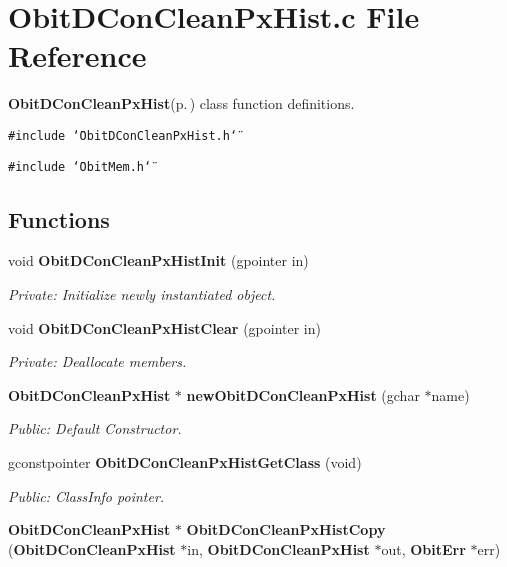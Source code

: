 \section{Obit\-DCon\-Clean\-Px\-Hist.c File Reference}
\label{ObitDConCleanPxHist_8c}
{\bf Obit\-DCon\-Clean\-Px\-Hist}{\rm (p.\,\pageref{structObitDConCleanPxHist})} class function definitions. 

{\tt \#include \char`\"{}Obit\-DCon\-Clean\-Px\-Hist.h\char`\"{}}\par
{\tt \#include \char`\"{}Obit\-Mem.h\char`\"{}}\par
\subsection*{Functions}
\begin{CompactItemize}
\item 
void {\bf Obit\-DCon\-Clean\-Px\-Hist\-Init} (gpointer in)
\begin{CompactList}\small\item\em Private: Initialize newly instantiated object. \item\end{CompactList}\item 
void {\bf Obit\-DCon\-Clean\-Px\-Hist\-Clear} (gpointer in)
\begin{CompactList}\small\item\em Private: Deallocate members. \item\end{CompactList}\item 
{\bf Obit\-DCon\-Clean\-Px\-Hist} $\ast$ {\bf new\-Obit\-DCon\-Clean\-Px\-Hist} (gchar $\ast$name)
\begin{CompactList}\small\item\em Public: Default Constructor. \item\end{CompactList}\item 
gconstpointer {\bf Obit\-DCon\-Clean\-Px\-Hist\-Get\-Class} (void)
\begin{CompactList}\small\item\em Public: Class\-Info pointer. \item\end{CompactList}\item 
{\bf Obit\-DCon\-Clean\-Px\-Hist} $\ast$ {\bf Obit\-DCon\-Clean\-Px\-Hist\-Copy} ({\bf Obit\-DCon\-Clean\-Px\-Hist} $\ast$in, {\bf Obit\-DCon\-Clean\-Px\-Hist} $\ast$out, {\bf Obit\-Err} $\ast$err)

\end{CompactItemize}
